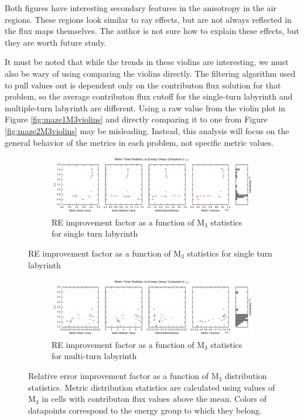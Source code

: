 Both figures have interesting secondary features in the anisotropy in the air
regions. These regions look similar to ray effects, but are not always reflected
in the flux maps themselves. The author is not sure how to explain these
effects, but they are worth future study.

It must be noted that while
the trends in these violins are interesting, we must also be wary of using comparing
the violins directly. The filtering algorithm used to pull values out is dependent only
on the contributon flux solution for that problem, so the average contributon
flux cutoff for the single-turn labyrinth and multiple-turn labyrinth are
different. Using a raw value from the violin plot in Figure
\ref{fig:maze1M3violins} and directly comparing it to one from Figure
\ref{fig:maze2M3violins} may be misleading. Instead, this analysis will focus on
the general behavior of the metrics in each problem, not specific metric values.

\begin{figure}[htb!]
  \centering
  \begin{subfigure}[t]{\textwidth}
    \includegraphics[width=\linewidth]{./chapters/characterization_probs/figures/char/maze2/metric_three_err_stats_mean.pdf}
    \caption{RE improvement factor as a function of M$_{3}$ statistics for single turn labyrinth}
    \label{fig:maze2M3errs}
  \end{subfigure}
\end{figure}
\begin{figure}[htb!]\ContinuedFloat
  \centering
  \begin{subfigure}[t]{\textwidth}
    \includegraphics[width=\linewidth]{./chapters/characterization_probs/figures/char/maze1/metric_three_err_stats_mean.pdf}
    \caption{RE improvement factor as a function of M$_3$ statistics for multi-turn labyrinth}
    \label{fig:maze1M3errs}
  \end{subfigure}
  \caption[Relative error improvement factor as a function of M$_3$
  distribution statistics.]
  {Relative error improvement factor as a function of M$_3$
  distribution statistics. Metric distribution statistics are calculated using
  values of M$_3$ in cells with contributon flux values above the mean. Colors
  of datapoints correspond to the energy group to which they belong.}
  \label{fig:labyrinthIREs}
\end{figure}

